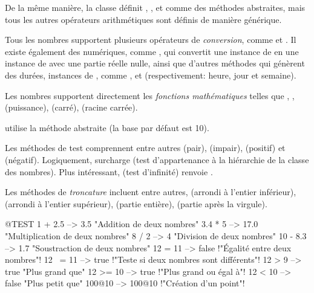 \documentclass[a4paper,10pt,twoside]{book}
\begin{document}
De la m\^eme mani\`ere, la classe  d\'efinit , ,  et  comme des m\'ethodes abstraites, mais tous les autres op\'erateurs arithm\'etiques sont d\'efinis de mani\`ere g\'en\'erique.

Tous les nombres supportent plusieurs op\'erateurs de  \emph{conversion}, comme  et . Il existe \'egalement des  num\'eriques,
comme , qui convertit une instance de  en
une instance de  avec une partie r\'eelle nulle, ainsi
que d'autres m\'ethodes qui g\'en\`erent des dur\'ees, instances de
, comme , 
et 
(respectivement: heure, jour et semaine).

Les nombres supportent directement les \emph{fonctions
  math\'ematiques} telles que ,
,  
(puissance),
(carr\'e),
(racine carr\'ee).

 utilise la m\'ethode abstraite
 (la base par d\'efaut est 10).

Les m\'ethodes de test comprennent entre autres 
(pair), 
(impair), 
(positif)
 et 
(n\'egatif).
Logiquement,  surcharge  
(test d'appartenance \`a la hi\'erarchie de la classe des nombres).
Plus int\'eressant,  
(test d'infinit\'e)
renvoie .

Les m\'ethodes de \emph{troncature} incluent entre autres,
(arrondi \`a l'entier inf\'erieur),
(arrondi \`a l'entier sup\'erieur), 
(partie enti\`ere), 
(partie apr\`es la virgule).

\begin{code}{@TEST}
1 + 2.5     --> 3.5             "Addition de deux nombres"
3.4 * 5      --> 17.0           "Multiplication de deux nombres"
8 / 2         --> 4                 "Division de deux nombres"
10 - 8.3   --> 1.7              "Soustraction de deux nombres"
12 = 11    --> false           !"\'Egalit\'e entre deux nombres"!
12 ~= 11 --> true            !"Teste si deux nombres sont diff\'erents"!
12 > 9      --> true            "Plus grand que"
12 >= 10  --> true            !"Plus grand ou \'egal \`a"!
12 < 10    --> false           "Plus petit que"
100@10   --> 100@10    !"Cr\'eation d'un point"!
\end{code}
\end{document}
